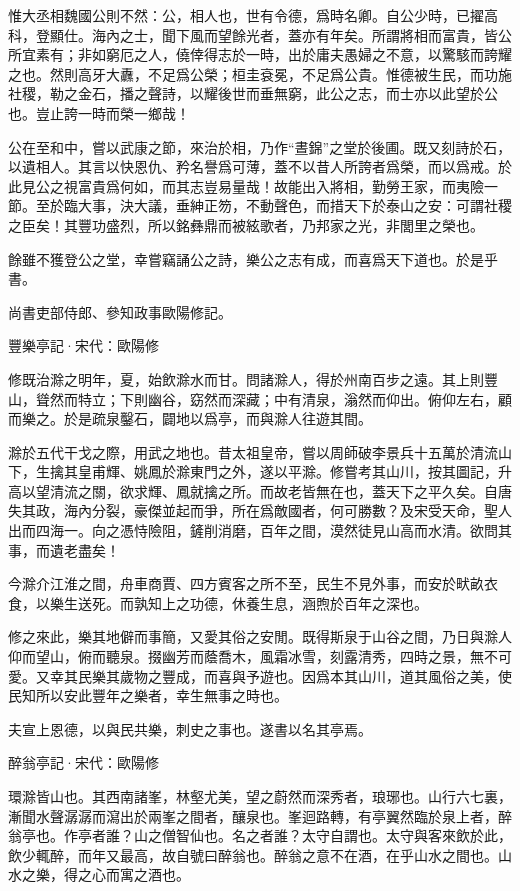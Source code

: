 \documentclass[12pt,a4paper]{ctexbook}
\begin{document}
惟大丞相魏國公則不然：公，相人也，世有令德，爲時名卿。自公少時，已擢高科，登顯仕。海內之士，聞下風而望餘光者，蓋亦有年矣。所謂將相而富貴，皆公所宜素有；非如窮厄之人，僥倖得志於一時，出於庸夫愚婦之不意，以驚駭而誇耀之也。然則高牙大纛，不足爲公榮；桓圭袞冕，不足爲公貴。惟德被生民，而功施社稷，勒之金石，播之聲詩，以耀後世而垂無窮，此公之志，而士亦以此望於公也。豈止誇一時而榮一鄉哉！\par
公在至和中，嘗以武康之節，來治於相，乃作“晝錦”之堂於後圃。既又刻詩於石，以遺相人。其言以快恩仇、矜名譽爲可薄，蓋不以昔人所誇者爲榮，而以爲戒。於此見公之視富貴爲何如，而其志豈易量哉！故能出入將相，勤勞王家，而夷險一節。至於臨大事，決大議，垂紳正笏，不動聲色，而措天下於泰山之安：可謂社稷之臣矣！其豐功盛烈，所以銘彝鼎而被絃歌者，乃邦家之光，非閭里之榮也。\par
餘雖不獲登公之堂，幸嘗竊誦公之詩，樂公之志有成，而喜爲天下道也。於是乎書。\par
尚書吏部侍郎、參知政事歐陽修記。\par
豐樂亭記·宋代：歐陽修 \par
修既治滁之明年，夏，始飲滁水而甘。問諸滁人，得於州南百步之遠。其上則豐山，聳然而特立；下則幽谷，窈然而深藏；中有清泉，滃然而仰出。俯仰左右，顧而樂之。於是疏泉鑿石，闢地以爲亭，而與滁人往遊其間。\par
滁於五代干戈之際，用武之地也。昔太祖皇帝，嘗以周師破李景兵十五萬於清流山下，生擒其皇甫輝、姚鳳於滁東門之外，遂以平滁。修嘗考其山川，按其圖記，升高以望清流之關，欲求輝、鳳就擒之所。而故老皆無在也，蓋天下之平久矣。自唐失其政，海內分裂，豪傑並起而爭，所在爲敵國者，何可勝數？及宋受天命，聖人出而四海一。向之憑恃險阻，鏟削消磨，百年之間，漠然徒見山高而水清。欲問其事，而遺老盡矣！\par
今滁介江淮之間，舟車商賈、四方賓客之所不至，民生不見外事，而安於畎畝衣食，以樂生送死。而孰知上之功德，休養生息，涵煦於百年之深也。\par
修之來此，樂其地僻而事簡，又愛其俗之安閒。既得斯泉于山谷之間，乃日與滁人仰而望山，俯而聽泉。掇幽芳而蔭喬木，風霜冰雪，刻露清秀，四時之景，無不可愛。又幸其民樂其歲物之豐成，而喜與予遊也。因爲本其山川，道其風俗之美，使民知所以安此豐年之樂者，幸生無事之時也。\par
夫宣上恩德，以與民共樂，刺史之事也。遂書以名其亭焉。\par
醉翁亭記·宋代：歐陽修 \par
環滁皆山也。其西南諸峯，林壑尤美，望之蔚然而深秀者，琅琊也。山行六七裏，漸聞水聲潺潺而瀉出於兩峯之間者，釀泉也。峯迴路轉，有亭翼然臨於泉上者，醉翁亭也。作亭者誰？山之僧智仙也。名之者誰？太守自謂也。太守與客來飲於此，飲少輒醉，而年又最高，故自號曰醉翁也。醉翁之意不在酒，在乎山水之間也。山水之樂，得之心而寓之酒也。\par
\end{document}
